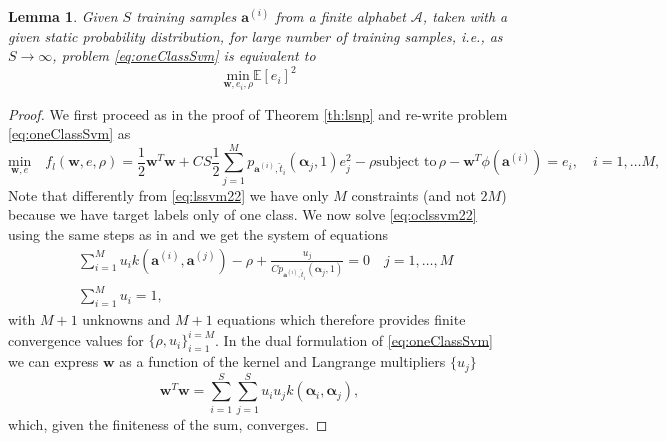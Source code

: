 \documentclass[draftcls,onecolumn,12pt]{IEEEtran}
\newcommand{\Exp}[1]{\mathbb{E}\left[#1\right]}
\newtheorem{lemma}{Lemma}
\begin{document}
\begin{lemma}
\label{lem:lem2}
Given $S$ training samples $\bm{a}^{(i)}$ from a finite alphabet $\mathcal A$, taken with a given static probability distribution, for large number of training samples, i.e., as $S \rightarrow \infty$, problem \eqref{eq:oneClassSvm} is equivalent to 
\begin{equation}
		\underset{\mathbf{w},e_i, \rho}{\text{min}} \Exp{e_i}^2
\end{equation}
\end{lemma}
\begin{proof}
We first proceed as in the proof of Theorem \ref{th:lsnp} and re-write problem \eqref{eq:oneClassSvm} as
	\begin{subequations}
		\label{eq:oclssvm22}
		\begin{equation}
		\label{eq:oclssvm2}
		\underset{\mathbf{w},e}{\text{min}} \quad f_l(\mathbf{w},e,\rho) = \frac{1}{2} \mathbf{w}^T \mathbf{w} + C S \frac{1}{2} \sum_{j=1}^M p_{\bm{a}^{(i)},\hat{t}_i}(\bm{\alpha}_j,1) e_j^2 - \rho  
		\end{equation}
		\begin{equation}
		\label{eq:ocstpart2}
		\text{subject to}\,  \rho - \mathbf{w}^T \phi (\mathbf{a}^{(i)})  = e_i,  \quad i = 1,\dots M, 
		\end{equation}		
	\end{subequations} 
Note that differently from \eqref{eq:lssvm22} we have only $M$ constraints (and not $2M$) because we have target labels only of one class.
We now solve \eqref{eq:oclssvm22} using the same steps as in \cite{choi2009least} and we get the system of equations
\begin{equation}
\begin{aligned}
	&\sum_{i=1}^{M}  u_i k( \mathbf{a}^{(i)},\mathbf{a}^{(j)}) - \rho + \frac{u_j}{Cp_{\bm{a}^{(i)},\hat{t}_i}(\bm{\alpha}_j,1)}=0 \quad j = 1,\dots, M\\
	&\sum_{i=1}^{M}u_i=1,
\end{aligned}	
\end{equation}
with $M+1$ unknowns and $M+1$ equations which therefore provides finite convergence values for $\{\rho,u_i\}_{i=1}^{i=M}$.
In the dual formulation of \eqref{eq:oneClassSvm} we can express $\mathbf{w}$ as a function of the kernel and Langrange multipliers $\{u_j\}$ 
\begin{equation}
\mathbf{w}^T\mathbf{w} = \sum_{i=1}^{S} \sum_{j=1}^{S} u_i u_j k(\bm{\alpha}_i,\bm{\alpha}_j), 
\end{equation}
which, given the finiteness of the sum, converges.

\end{proof}
\end{document}
